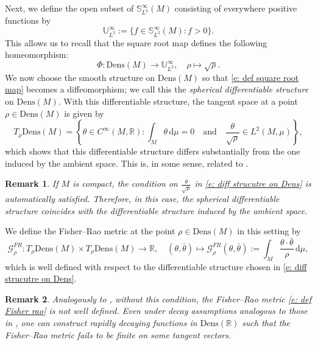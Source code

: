 \documentclass[12pt]{amsart}
\newtheorem{remark}[remark]{Remark}
\numberwithin{figure}{section}
\numberwithin{table}{section}
\numberwithin{equation}{section}
\def\S{\mathbb{S}}
\def\RR{\mathbb{R}}
\begin{document}
Next, we define the open subset of \(\S_{L^2}^{\infty}(M)\) consisting of everywhere positive functions by
\begin{equation}
    \mathbb{U}_{L^2}^{\infty}:=\{f\in \S_{L^2}^{\infty}(M): f>0\}.
\end{equation}
This allows us to recall that the square root map defines the following homeomorphism:
\begin{equation}\label{e: def square root map}
    \varPhi:  \mathrm{Dens}(M) \longrightarrow  \mathbb{U}_{L^2}^{\infty}, \quad \rho \mapsto \sqrt{\rho}.
\end{equation}
We now choose the smooth structure on \(\mathrm{Dens}(M)\) so that \eqref{e: def square root map} becomes a diffeomorphism; we call this the \emph{spherical differentiable structure} on \(\mathrm{Dens}(M)\). With this differentiable structure, the tangent space at a point \(\rho\in \mathrm{Dens}(M)\) is given by
\begin{equation}\label{e: diff strucutre on Dens}
    T_{\rho}\mathrm{Dens}(M) = \left\{ \theta \in C^{\infty}(M,\RR) : \int_M \theta\, \mathrm{d}\mu = 0 \quad \text{and} \quad \frac{\theta}{\sqrt{\rho}} \in L^2(M, \mu) \right\},
\end{equation}
which shows that this differentiable structure differs substantially from the one induced by the ambient space.  This is, in some sense, related to \cite[§2]{Friedrich1991}.

\begin{remark}
If \(M\) is compact, the condition on \(\frac{\theta}{\sqrt{\rho}}\) in \eqref{e: diff strucutre on Dens} is automatically satisfied. Therefore, in this case, the spherical differentiable structure coincides with the differentiable structure induced by the ambient space.
\end{remark}

We define the Fisher--Rao metric at the point \(\rho \in \mathrm{Dens}(M)\) in this setting by
\begin{equation}\label{e: def Fisher rao}
    \mathcal{G}^{FR}_{\rho} : T_{\rho}\mathrm{Dens}(M) \times T_{\rho}\mathrm{Dens}(M) \longrightarrow \mathbb{R}, \quad (\theta, \bar{\theta}) \mapsto \mathcal{G}^{FR}_{\rho}(\theta, \bar{\theta}) := \int_{M} \frac{\theta \cdot \bar{\theta}}{\rho}\, \mathrm{d}\mu,
\end{equation}
which is well defined with respect to the differentiable structure chosen in \eqref{e: diff strucutre on Dens}.

\begin{remark}
Analogously to , without this condition, the Fisher--Rao metric \eqref{e: def Fisher rao} is not well defined. Even under decay assumptions analogous to those in \cite[§3.5]{MichorMumfordZoo}, one can construct rapidly decaying functions in \(\mathrm{Dens}(\RR)\) such that the Fisher--Rao metric fails to be finite on some tangent vectors.
\end{remark}
\end{document}
